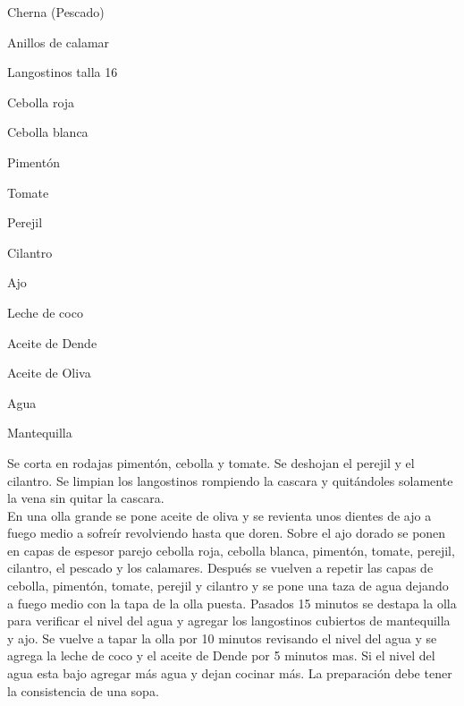 

\begin{ingredientes}
\item Cherna (Pescado)
\item Anillos de calamar
\item Langostinos talla 16
\item Cebolla roja
\item Cebolla blanca
\item Pimentón
\item Tomate
\item Perejil
\item Cilantro
\item Ajo
\item Leche de coco
\item Aceite de Dende
\item Aceite de Oliva
\item Agua
\item Mantequilla
\end{ingredientes}

\preparacion
Se corta en rodajas pimentón, cebolla y tomate. Se deshojan el perejil y el cilantro. Se limpian los langostinos rompiendo la cascara y quitándoles solamente la vena sin quitar la cascara.\\

En una olla grande se pone aceite de oliva y se revienta unos dientes de ajo a fuego medio a sofreír revolviendo hasta que doren. Sobre el ajo dorado se ponen en capas de espesor parejo cebolla roja, cebolla blanca, pimentón, tomate, perejil, cilantro, el pescado y los calamares. Después se vuelven a repetir las capas de cebolla, pimentón, tomate, perejil y cilantro y se pone una taza de agua dejando a fuego medio con la tapa de la olla puesta. Pasados 15 minutos se destapa la olla para verificar el nivel del agua y agregar los langostinos cubiertos de mantequilla y ajo. Se vuelve a tapar la olla por 10 minutos revisando el nivel del agua y se agrega la leche de coco y el aceite de Dende por 5 minutos mas. Si el nivel del agua esta bajo agregar más agua y dejan cocinar más. La preparación debe tener la consistencia de una sopa.